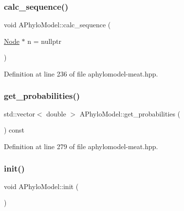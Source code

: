 \subsubsection{\texorpdfstring{calc\+\_\+sequence()}{calc\_sequence()}}
{\footnotesize\ttfamily void A\+Phylo\+Model\+::calc\+\_\+sequence (\begin{DoxyParamCaption}\item[{\hyperlink{class_node}{Node} $\ast$}]{n = {\ttfamily nullptr} }\end{DoxyParamCaption})\hspace{0.3cm}{\ttfamily [inline]}}



Definition at line 236 of file aphylomodel-\/meat.\+hpp.

\mbox{\label{class_a_phylo_model_a3368d03919454f68f0cb5bd888f983a1}} 
\subsubsection{\texorpdfstring{get\+\_\+probabilities()}{get\_probabilities()}}
{\footnotesize\ttfamily std\+::vector$<$ double $>$ A\+Phylo\+Model\+::get\+\_\+probabilities (\begin{DoxyParamCaption}{ }\end{DoxyParamCaption}) const\hspace{0.3cm}{\ttfamily [inline]}}



Definition at line 279 of file aphylomodel-\/meat.\+hpp.

\mbox{\label{class_a_phylo_model_a45a7af583f9619bce5d88b15303a73e6}} 
\subsubsection{\texorpdfstring{init()}{init()}}
{\footnotesize\ttfamily void A\+Phylo\+Model\+::init (\begin{DoxyParamCaption}{ }\end{DoxyParamCaption})\hspace{0.3cm}{\ttfamily [inline]}}



